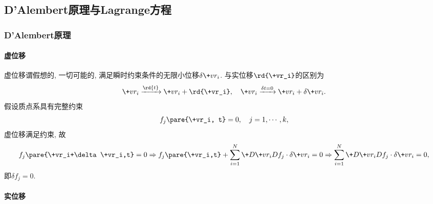 \documentclass{ctexart}
\begin{document}


\subsection{D'Alembert原理与Lagrange方程} %
\label{sub:d_alembert原理与lagrange方程}

\subsubsection{D'Alembert原理} %
\label{ssub:d_alembert原理}

\paragraph{虚位移} %
\label{par:虚位移}

虚位移谓假想的, 一切可能的, 满足瞬时约束条件的无限小位移$\delta\+vr_i$. 与实位移$\rd{\+vr_i}$的区别为
\[ \+vr_i \xrightarrow{\rd{t}} \+vr_i+\rd{\+vr_i},\quad \+vr_i \xrightarrow{\delta t = 0} \+vr_i + \delta\+vr_i. \]
假设质点系具有完整约束
\[ f_j\pare{\+vr_i, t} = 0,\quad j = 1,\cdots, k, \]
虚位移满足约束, 故
\[ f_j\pare{\+vr_i+\delta \+vr_i,t} = 0 \Rightarrow f_j\pare{\+vr_i,t} + \sum_{i=1}^N \+D{\+vr_i}D{f_j}\cdot\delta\+vr_i = 0 \Rightarrow \sum_{i=1}^N \+D{\+vr_i}D{f_j}\cdot\delta\+vr_i = 0, \]
即$\delta f_j = 0$.


\paragraph{实位移} %
\label{par:实位移}
\end{document}
